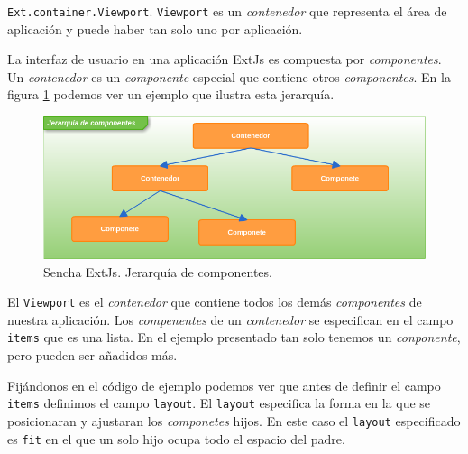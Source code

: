 	\texttt{Ext.container.Viewport}. \texttt{Viewport} es un \emph{contenedor} que representa el área de aplicación y puede haber tan solo uno por
	aplicación. 
 	\par
 	La interfaz de usuario en una aplicación ExtJs es compuesta por \emph{componentes}. Un \emph{contenedor} es un \emph{componente} especial que
	contiene otros \emph{componentes}. En la figura \ref{fig:comps} podemos ver un ejemplo que ilustra esta jerarquía.
	\begin{figure}[h]
		\centering
		\includegraphics[keepaspectratio, width=1\textwidth]{./img/comps.png}
		\caption{Sencha ExtJs. Jerarquía de componentes.}   
		\label{fig:comps}
	\end{figure}
 	\par
 	El \texttt{Viewport} es el \emph{contenedor} que contiene todos los demás \emph{componentes} de nuestra aplicación. Los \emph{compenentes} de
	un \emph{contenedor} se especifican en el campo \texttt{items} que es una lista. En el ejemplo presentado tan solo tenemos un 
	\emph{conponente}, pero pueden ser añadidos más.
 	\par
 	Fijándonos en el código de ejemplo podemos ver que antes de definir el campo \texttt{items} definimos el campo \texttt{layout}. El \texttt{layout}
	especifica la forma en la que se posicionaran y ajustaran los \emph{componetes} hijos. En este caso el \texttt{layout} especificado es 
	\texttt{\cc fit\cc} en el que un solo hijo ocupa todo el espacio del padre. 
